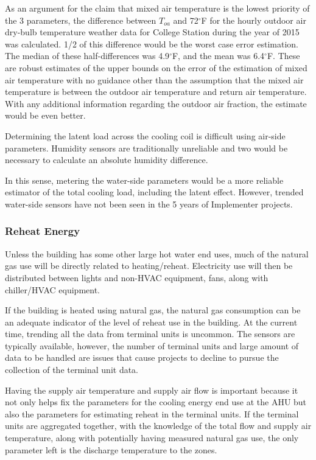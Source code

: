 As an argument for the claim that mixed air temperature is the lowest priority of
the 3 parameters, the difference between \(T_{oa}\) and 72\(^\circ\)F
for the hourly outdoor air dry-bulb temperature weather data for College
Station during the year of 2015 was calculated. 1/2 of this
difference would be the worst case error estimation. The median of these
half-differences was 4.9\(^\circ\)F, and the mean was 6.4\(^\circ\)F.
These are robust estimates of the upper bounds on the error of the
estimation of mixed air temperature with no guidance other than the assumption
that the mixed air temperature is between the outdoor air temperature and return
air temperature. With any additional information regarding the outdoor
air fraction, the estimate would be even better. 

Determining the latent load across the cooling coil is difficult using
air-side parameters. Humidity sensors are traditionally unreliable and
two would be necessary to calculate an absolute humidity
difference.

In this sense, metering the water-side parameters would be a more
reliable estimator of the total cooling load, including the latent
effect. However, trended water-side sensors have not been seen in the 5
years of Implementer projects.

\subsubsection{Reheat Energy}

Unless the building has some other large hot water end uses, much of the
natural gas use will be directly related to heating/reheat. Electricity
use will then be distributed between lights and non-HVAC equipment,
fans, along with chiller/HVAC equipment. 

If the building is heated using natural gas, the natural gas consumption
can be an adequate indicator of the level of reheat use in the building.
At the current time, trending all the data from terminal units is
uncommon. The sensors are typically available, however, the number of
terminal units and large amount of data to be handled are issues that
cause projects to decline to pursue the collection of the terminal unit data.

Having the supply air temperature and supply air flow is important
because it not only helps fix the parameters for the cooling energy end
use at the AHU but also the parameters for estimating reheat in the
terminal units. If the terminal units are aggregated together, with the
knowledge of the total flow and supply air temperature, along with
potentially having measured natural gas use, the only parameter left is
the discharge temperature to the zones. 

